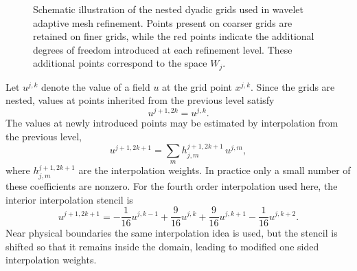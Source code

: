 \begin{figure}[t]
\centering
{}
\caption[Nested dyadic grid hierarchy for WAMR]{
Schematic illustration of the nested dyadic grids used in wavelet adaptive mesh refinement. Points present on coarser grids are retained on finer grids, while the red points indicate the additional degrees of freedom introduced at each refinement level. These additional points correspond to the space $W_j$.
}
\label{fig:wamr grid hierarchy}
\end{figure}

Let $u^{j,k}$ denote the value of a field $u$ at the grid point $x^{j,k}$. Since the grids are nested, values at points inherited from the previous level satisfy
\begin{equation}
    u^{j+1,2k}
    =
    u^{j,k}.
\end{equation}
The values at newly introduced points may be estimated by interpolation from the previous level,
\begin{equation}
    u^{j+1,2k+1}
    =
    \sum_m h^{j+1,2k+1}_{j,m}\,u^{j,m},
\end{equation}
where $h^{j+1,2k+1}_{j,m}$ are the interpolation weights. In practice only a small number of these coefficients are nonzero. For the fourth order interpolation used here, the interior interpolation stencil is
\begin{equation}
    u^{j+1,2k+1}
    =
    -\frac{1}{16}u^{j,k-1}
    +\frac{9}{16}u^{j,k}
    +\frac{9}{16}u^{j,k+1}
    -\frac{1}{16}u^{j,k+2}.
\end{equation}
Near physical boundaries the same interpolation idea is used, but the stencil is shifted so that it remains inside the domain, leading to modified one sided interpolation weights.

